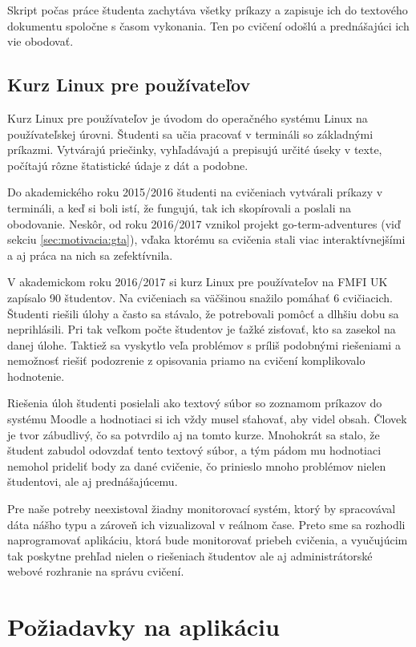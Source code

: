 Skript počas práce študenta zachytáva všetky príkazy a zapisuje ich do textového
dokumentu spoločne s časom vykonania. Ten po cvičení odošlú a prednášajúci ich vie
obodovať.

\subsection{Kurz Linux pre používateľov}
\label{sec:motivacia:linuxforusers}

Kurz Linux pre používateľov je úvodom do operačného systému Linux
na používateľskej úrovni. Študenti sa učia pracovať v termináli so základnými
príkazmi. Vytvárajú priečinky, vyhľadávajú a prepisujú určité úseky v texte,
počítajú rôzne štatistické údaje z dát a podobne.

Do akademického roku 2015/2016 študenti na cvičeniach vytvárali príkazy v
termináli, a keď si boli istí, že fungujú, tak ich skopírovali a poslali na obodovanie.
Neskôr, od roku 2016/2017 vznikol projekt go-term-adventures
(viď sekciu \ref{sec:motivacia:gta}), vďaka ktorému sa
cvičenia stali viac interaktívnejšími a aj práca na nich sa zefektívnila.

V akademickom roku 2016/2017 si kurz Linux pre používateľov na FMFI UK zapísalo
90 študentov. Na cvičeniach sa väčšinou snažilo pomáhať 6 cvičiacich. Študenti riešili
úlohy a často sa stávalo, že potrebovali pomôcť a dlhšiu dobu sa neprihlásili.
Pri tak veľkom počte študentov je ťažké zisťovať, kto sa zasekol na danej úlohe.
Taktiež sa vyskytlo veľa problémov s príliš podobnými riešeniami a nemožnosť riešiť podozrenie z opisovania priamo na cvičení komplikovalo hodnotenie.

Riešenia úloh študenti posielali ako textový súbor so zoznamom príkazov do systému
Moodle a hodnotiaci si ich vždy musel sťahovať, aby videl obsah. Človek je
tvor zábudlivý, čo sa potvrdilo aj na tomto kurze. Mnohokrát sa stalo, že študent
zabudol odovzdať tento textový súbor, a tým pádom mu hodnotiaci nemohol prideliť
body za dané cvičenie, čo prinieslo mnoho problémov nielen študentovi, ale aj
prednášajúcemu.

Pre naše potreby neexistoval žiadny monitorovací systém, ktorý by spracovával
dáta nášho typu a zároveň ich vizualizoval v reálnom čase. 
Preto sme sa rozhodli naprogramovať aplikáciu, ktorá bude
monitorovať priebeh cvičenia, a vyučujúcim tak poskytne prehľad nielen o riešeniach
študentov ale aj administrátorské webové rozhranie na správu cvičení.

\section{Požiadavky na aplikáciu}
\label{sec:apprequirements}

